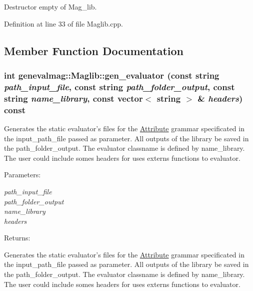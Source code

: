 Destructor empty of Mag\_\-lib. 

Definition at line 33 of file Maglib.cpp.

\subsection{Member Function Documentation}
\hypertarget{classgenevalmag_1_1Maglib_b6c7b296368fe019f7e7fcf690b5e241}{
\subsubsection[{gen\_\-evaluator}]{\setlength{\rightskip}{0pt plus 5cm}int genevalmag::Maglib::gen\_\-evaluator (const string {\em path\_\-input\_\-file}, \/  const string {\em path\_\-folder\_\-output}, \/  const string {\em name\_\-library}, \/  const vector$<$ string $>$ \& {\em headers}) const}}
\label{classgenevalmag_1_1Maglib_b6c7b296368fe019f7e7fcf690b5e241}


Generates the static evaluator's files for the \hyperlink{classgenevalmag_1_1Attribute}{Attribute} grammar specificated in the input\_\-path\_\-file passed as parameter. All outputs of the library be saved in the path\_\-folder\_\-output. The evaluator classname is defined by name\_\-library. The user could include somes headers for uses externs functions to evaluator.

\begin{Desc}
\item[Parameters:]
\begin{description}
\item[{\em path\_\-input\_\-file}]\item[{\em path\_\-folder\_\-output}]\item[{\em name\_\-library}]\item[{\em headers}]\end{description}
\end{Desc}
\begin{Desc}
\item[Returns:]\end{Desc}
Generates the static evaluator's files for the \hyperlink{classgenevalmag_1_1Attribute}{Attribute} grammar specificated in the input\_\-path\_\-file passed as parameter. All outputs of the library be saved in the path\_\-folder\_\-output. The evaluator classname is defined by name\_\-library. The user could include somes headers for uses externs functions to evaluator. 

